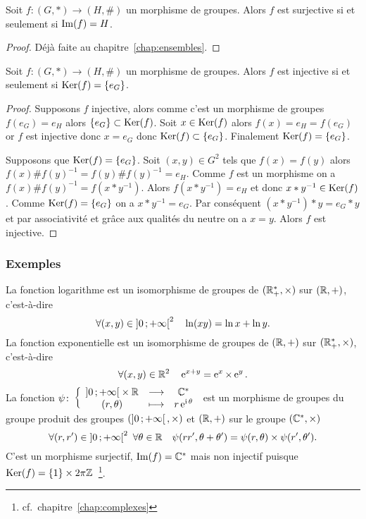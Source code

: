 \begin{prop}
  Soit \(f:(G,*) \longrightarrow (H,\#)\) un morphisme de groupes. Alors \(f\) est surjective si et seulement si \(\operatorname{Im}(f)=H\).
\end{prop}
\begin{proof}
  Déjà faite au chapitre~\ref{chap:ensembles}.
\end{proof}
\begin{prop}
  Soit \(f:(G,*) \longrightarrow (H,\#)\) un morphisme de groupes. Alors \(f\) est injective si et seulement si \(\operatorname{Ker}(f)=\{e_G\}\).
\end{prop}
\begin{proof}
  Supposons \(f\) injective, alors comme c'est un morphisme de groupes \(f(e_G)=e_H\) alors \(\{e_G\} \subset \operatorname{Ker}(f)\). Soit \(x \in \operatorname{Ker}(f)\) alors \(f(x)=e_H=f(e_G)\) or \(f\) est injective donc \(x=e_G\) donc \(\operatorname{Ker}(f) \subset \{e_G\}\). Finalement \(\operatorname{Ker}(f)=\{e_G\}\).

Supposons que \(\operatorname{Ker}(f)=\{e_G\}\). Soit \((x,y) \in G^2\) tels que \(f(x)=f(y)\) alors \(f(x)\#f(y)^{-1}=f(y)\#f(y)^{-1} = e_H\). Comme \(f\) est un morphisme on a \(f(x)\#f(y)^{-1} = f(x*y^{-1})\). Alors \(f(x*y^{-1}) = e_H\) et donc \(x*y^{-1} \in \operatorname{Ker}(f)\). Comme \(\operatorname{Ker}(f)=\{e_G\}\) on a \(x*y^{-1} = e_G\). Par conséquent \((x*y^{-1})*y = e_G*y\) et par associativité et grâce aux qualités du neutre on a \(x=y\). Alors \(f\) est injective.
\end{proof}

\subsubsection{Exemples}

La fonction logarithme est un isomorphisme de groupes de \((\mathbb{R}^{*}_+,\times)\) sur \((\mathbb{R},+)\), c'est-à-dire
\begin{equation}
  \forall (x,y) \in \left] 0 \, ;  +\infty \right[^2 \quad \ln(xy) = \ln x + \ln y.
\end{equation}
La fonction exponentielle est un isomorphisme de groupes de \((\mathbb{R},+)\) sur \((\mathbb{R}^{*}_+,\times)\), c'est-à-dire
\begin{equation}
  \forall (x,y) \in \mathbb{R}^2 \quad \operatorname{e}^{x+y} = \operatorname{e}^x \times \operatorname{e}^y.
\end{equation}
La fonction \(\psi\colon \left\{\begin{array}{ccc} \left] 0 \, ;  +\infty \right[ \times \mathbb{R} & \longrightarrow &\mathbb{C}^{*}\\ (r,\theta) & \longmapsto & r\operatorname{e}^{\operatorname{i} \theta} \end{array} \right.\) est un morphisme de groupes du groupe produit des groupes \((\left] 0 \, ;  +\infty \right[,\times)\) et \((\mathbb{R},+)\) sur le groupe \((\mathbb{C}^{*},\times)\)
\begin{equation}
  \forall (r,r') \in \left] 0 \, ;  +\infty \right[^2 \ \forall \theta \in \mathbb{R} \quad \psi(rr',\theta+\theta')=\psi(r,\theta) \times \psi(r',\theta').
\end{equation}
C'est un morphisme surjectif, \(\operatorname{Im}(f)=\mathbb{C}^{*}\) mais non injectif puisque \(\operatorname{Ker}(f)=\{1\}\times 2\pi \mathbb{Z}\)~\footnote{cf.\ chapitre~\ref{chap:complexes}}.

